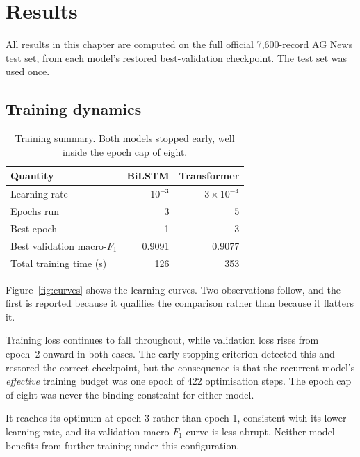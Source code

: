 \chapter{Results}
\label{ch:results}

All results in this chapter are computed on the full official 7{,}600-record AG News test set, from
each model's restored best-validation checkpoint. The test set was used once.

\section{Training dynamics}

\begin{table}[ht]
\centering
\caption{Training summary. Both models stopped early, well inside the epoch cap of eight.}
\label{tab:training_summary}
\begin{tabular}{lrr}
\toprule
\textbf{Quantity} & \textbf{BiLSTM} & \textbf{Transformer} \\
\midrule
Learning rate                      & $10^{-3}$ & $3\times10^{-4}$ \\
Epochs run                         & 3 & 5 \\
Best epoch                         & 1 & 3 \\
Best validation macro-$F_1$ & 0.9091 & 0.9077 \\
Total training time (s)            & 126 & 353 \\
\bottomrule
\end{tabular}
\end{table}

Figure~\ref{fig:curves} shows the learning curves. Two observations follow, and the first is
reported because it qualifies the comparison rather than because it flatters it.

Training loss continues to fall throughout, while validation loss rises from epoch~2 onward in both
cases. The early-stopping criterion detected this and restored the correct checkpoint, but the
consequence is that the recurrent model's \emph{effective} training budget was one epoch of 422
optimisation steps. The epoch cap of eight was never the binding constraint for either model.

 It reaches its optimum at epoch
3 rather than epoch 1, consistent with its lower learning rate, and its validation macro-$F_1$
curve is less abrupt. Neither model benefits from further training under this configuration.

